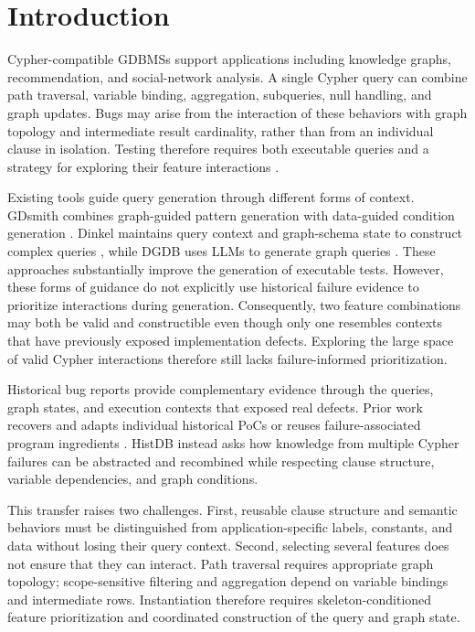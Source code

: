 \documentclass[acmsmall,screen,anonymous]{acmart}
\begin{document}
\maketitle

\section{Introduction}

Cypher-compatible GDBMSs support applications including knowledge graphs, recommendation, and social-network analysis. A single Cypher query can combine path traversal, variable binding, aggregation, subqueries, null handling, and graph updates. Bugs may arise from the interaction of these behaviors with graph topology and intermediate result cardinality, rather than from an individual clause in isolation. Testing therefore requires both executable queries and a strategy for exploring their feature interactions \cite{ref3,ref7}.

Existing tools guide query generation through different forms of context. GDsmith combines graph-guided pattern generation with data-guided condition generation \cite{ref3}. Dinkel maintains query context and graph-schema state to construct complex queries \cite{ref7}, while DGDB uses LLMs to generate graph queries \cite{ref8}. These approaches substantially improve the generation of executable tests. However, these forms of guidance do not explicitly use historical failure evidence to prioritize interactions during generation. Consequently, two feature combinations may both be valid and constructible even though only one resembles contexts that have previously exposed implementation defects. Exploring the large space of valid Cypher interactions therefore still lacks failure-informed prioritization.

Historical bug reports provide complementary evidence through the queries, graph states, and execution contexts that exposed real defects. Prior work recovers and adapts individual historical PoCs or reuses failure-associated program ingredients \cite{refBugForge,refJavaTailor,refHistFuzz,ref27}. HistDB instead asks how knowledge from multiple Cypher failures can be abstracted and recombined while respecting clause structure, variable dependencies, and graph conditions.

This transfer raises two challenges. First, reusable clause structure and semantic behaviors must be distinguished from application-specific labels, constants, and data without losing their query context. Second, selecting several features does not ensure that they can interact. Path traversal requires appropriate graph topology; scope-sensitive filtering and aggregation depend on variable bindings and intermediate rows. Instantiation therefore requires skeleton-conditioned feature prioritization and coordinated construction of the query and graph state.
\end{document}

